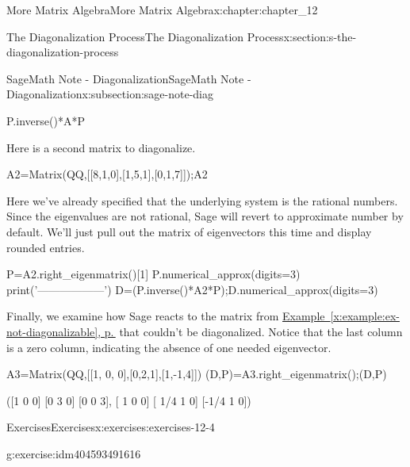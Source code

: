 \documentclass[twoside,10pt,]{book}
\newcommand{\xreffont}{\relax}
\numberwithin{equation}{section}
\begin{document}
\begin{chapterptx}{More Matrix Algebra}{}{More Matrix Algebra}{}{}{x:chapter:chapter_12}
\begin{sectionptx}{The Diagonalization Process}{}{The Diagonalization Process}{}{}{x:section:s-the-diagonalization-process}
\begin{subsectionptx}{SageMath Note - Diagonalization}{}{SageMath Note - Diagonalization}{}{}{x:subsection:sage-note-diag}
\begin{sageinput}
P.inverse()*A*P
\end{sageinput}
\begin{sageoutput}
[6 0 0]
[0 4 0]
[0 0 3]
\end{sageoutput}
Here is a second matrix to diagonalize.%
\begin{sageinput}
A2=Matrix(QQ,[[8,1,0],[1,5,1],[0,1,7]]);A2
\end{sageinput}
\begin{sageoutput}
[8 1 0]
[1 5 1]
[0 1 7]
\end{sageoutput}
Here we've already specified that the underlying system is the rational numbers.  Since the eigenvalues are not rational, Sage will revert to approximate number by default. We'll just pull out the matrix of eigenvectors this time and display rounded entries.%
\begin{sageinput}
P=A2.right_eigenmatrix()[1]
P.numerical_approx(digits=3)
print('------------------')
D=(P.inverse()*A2*P);D.numerical_approx(digits=3)
\end{sageinput}
\begin{sageoutput}
[ 4.35 0.000 0.000]
[0.000  7.27 0.000]
[0.000 0.000  8.38]
\end{sageoutput}
Finally, we examine how Sage reacts to the matrix from \hyperref[x:example:ex-not-diagonalizable]{Example~{\xreffont\ref{x:example:ex-not-diagonalizable}}, p.\,\pageref{x:example:ex-not-diagonalizable}} that couldn't be diagonalized.   Notice that the last column is a zero column, indicating the absence of one needed eigenvector.%
\begin{sageinput}
A3=Matrix(QQ,[[1, 0, 0],[0,2,1],[1,-1,4]])
(D,P)=A3.right_eigenmatrix();(D,P)
\end{sageinput}
\begin{sageoutput}
([1 0 0]
[0 3 0]
[0 0 3], 
[   1    0    0]
[ 1/4    1    0]
[-1/4    1    0])
\end{sageoutput}
\end{subsectionptx}
%
%
\typeout{************************************************}
\typeout{************************************************}
%
\begin{exercises-subsection}{Exercises}{}{Exercises}{}{}{x:exercises:exercises-12-4}
\begin{divisionexercise}{1}{}{}{g:exercise:idm404593491616}%
%
\end{divisionexercise}
\end{exercises-subsection}
\end{sectionptx}
\end{chapterptx}
\end{document}
